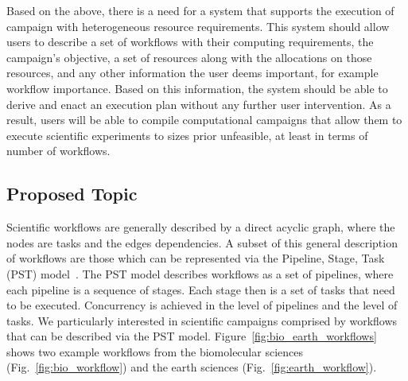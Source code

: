 Based on the above, there is a need for a system that supports the execution of campaign with heterogeneous resource requirements.
This system should allow users to describe a set of workflows with their computing requirements, the campaign's objective, a set of resources along with the allocations on those resources, and any other information the user deems important, for example workflow importance.
Based on this information, the system should be able to derive and enact an execution plan without any further user intervention.
As a result, users will be able to compile computational campaigns that allow them to execute scientific experiments to sizes prior unfeasible, at least in terms of number of workflows.


\subsection{Proposed Topic}

Scientific workflows are generally described by a direct acyclic graph, where the nodes are tasks and the edges dependencies.
A subset of this general description of workflows are those which can be represented via the Pipeline, Stage, Task (PST) model~\cite{balasubramanian2018harnessing}.
The PST model describes workflows as a set of pipelines, where each pipeline is a sequence of stages.
Each stage then is a set of tasks that need to be executed.
Concurrency is achieved in the level of pipelines and the level of tasks. 
We particularly interested in scientific campaigns comprised by workflows that can be described via the PST model.
Figure~\ref{fig:bio_earth_workflows} shows two example workflows from the biomolecular sciences (Fig.~\ref{fig:bio_workflow}) and the earth sciences (Fig.~\ref{fig:earth_workflow}). 

